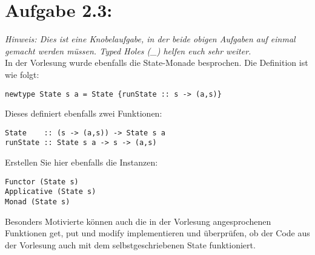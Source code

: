 \documentclass[a4paper,10pt]{scrartcl}
\newcommand{\theuebungszettel}{2}
\begin{document}
\section*{Aufgabe \theuebungszettel.3:}
\emph{Hinweis: Dies ist eine Knobelaufgabe, in der beide obigen Aufgaben auf einmal gemacht werden müssen. Typed Holes (\_) helfen euch sehr weiter.}\\
In der Vorlesung wurde ebenfalls die State-Monade besprochen. Die Definition ist wie folgt:
\begin{verbatim}
newtype State s a = State {runState :: s -> (a,s)}
\end{verbatim}
Dieses definiert ebenfalls zwei Funktionen:
\begin{verbatim}
State    :: (s -> (a,s)) -> State s a
runState :: State s a -> s -> (a,s)
\end{verbatim}
Erstellen Sie hier ebenfalls die Instanzen:
\begin{verbatim}
Functor (State s)
Applicative (State s)
Monad (State s)
\end{verbatim}
Besonders Motivierte können auch die in der Vorlesung angesprochenen Funktionen get, put und modify implementieren und überprüfen, ob der Code aus der Vorlesung auch mit dem selbstgeschriebenen State funktioniert.
\end{document}
